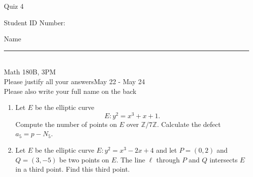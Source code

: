 \documentclass[12pt]{article}
\newcommand{\integers}{\mathbb{Z}}
\begin{document}
\begin{flushleft} 
\centerline{\LARGE{Quiz 4}} 
\vspace{5 mm}
{Student ID Number:}\hfill  
{Name \rule {2 in}{0.01in}}\\
Math 180B, 3PM
\\
{Please justify all your answers}\hfill {May 22 - May 24}
\\
{Please also write your full name on the back} 

\medskip
\end{flushleft}

\begin{enumerate}
	\item Let $E$ be the elliptic curve
	\[
	E: y^2 = x^3 + x + 1.
	\]
	Compute the number of points on $E$ over $\integers/7\integers$. Calculate the defect $a_5 = p - N_5$.

	\vfill

	\item Let $E$ be the elliptic curve $E: y^2 = x^3 - 2x + 4$ and let $P = (0, 2)$ and $Q = (3, -5)$ be two points on $E$. The line $\ell$ through $P$ and $Q$ intersects $E$ in a third point. Find this third point.

	\vfill
\end{enumerate}
\end{document}
